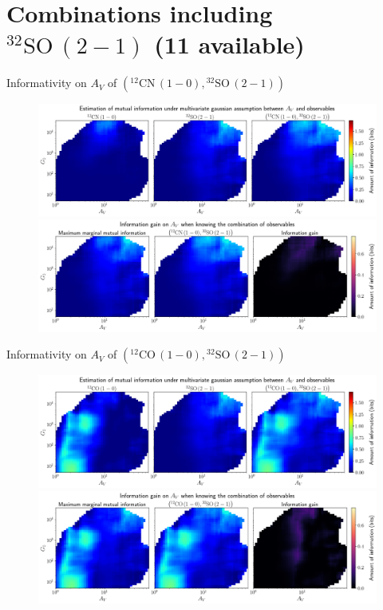 \documentclass{beamer}
\begin{document}
\section{Combinations including $\mathrm{^{32}SO\,(2-1)}$ (11 available)}

\begin{frame}{Informativity on $A_V$ of $\left(\mathrm{^{12}CN\,(1-0)},\mathrm{^{32}SO\,(2-1)}\right)$}
    \begin{figure}
        \centering
        \includegraphics[width=0.95\linewidth]{../linearinfogauss/av__12cn10_32so21_linearinfogauss.png}
        \vfill
        \includegraphics[width=0.95\linewidth]{../linearinfogauss/av__12cn10_32so21_linearinfogauss_gain.png}
    \end{figure}
\end{frame}

\begin{frame}{Informativity on $A_V$ of $\left(\mathrm{^{12}CO\,(1-0)},\mathrm{^{32}SO\,(2-1)}\right)$}
    \begin{figure}
        \centering
        \includegraphics[width=0.95\linewidth]{../linearinfogauss/av__12co10_32so21_linearinfogauss.png}
        \vfill
        \includegraphics[width=0.95\linewidth]{../linearinfogauss/av__12co10_32so21_linearinfogauss_gain.png}
    \end{figure}
\end{frame}
\end{document}

